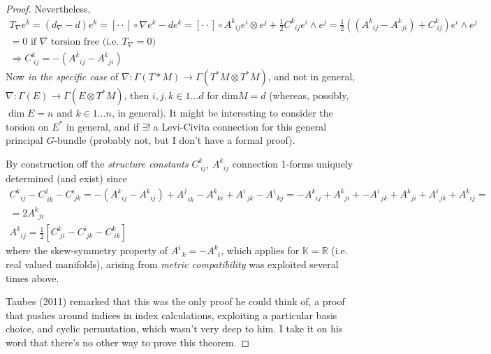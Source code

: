 \documentclass[10pt, twoside]{amsart}
\begin{document}
\begin{multicols*}{2}
\begin{proof}
Nevertheless, 
\[
\begin{gathered}
  T_{\nabla} e^k = (d_{\nabla} - d) e^k = [\cdot \cdot ] \circ \nabla e^k - de^k = [\cdot \cdot ] \circ A^k_{ \; \; ij} e^i \otimes e^j + \frac{1}{2} C^k_{ \; \; ij} e^i \wedge e^j = \frac{1}{2} ( (A^k_{ \; \; ij} - A^k_{ \; \; ji} ) + C^k_{ \; ij} ) e^i \wedge e^j \\ 
  =0 \text{ if $\nabla$ torsion free (i.e. $T_{\nabla} =0$) } \\
  \Longrightarrow C^k_{ \; ij} = -(A^k_{ \; \; ij} - A^k_{ \; \; ji})
\end{gathered}
\]
Now \emph{in the specific case} of $\nabla : \Gamma (T*M) \to \Gamma(T^*M \otimes T^*M)$, and not in general, $\nabla : \Gamma(E) \to \Gamma(E \otimes T^*M)$, then $i,j,k \in 1 \dots d$ for $\text{dim}M=d$ (whereas, possibly, $\dim{E}=n$ and $k \in 1 \dots n$, in general).  It might be interesting to consider the torsion on $E^*$ in general, and if $\exists ! $ a Levi-Civita connection for this general principal $G$-bundle (probably not, but I don't have a formal proof).  

By construction off the \emph{structure constants} $C^k_{\; ij}$, $A^k_{\; \; ij}$ connection 1-forms uniquely determined (and exist) since
\[
\begin{gathered}
  C^k_{ \; \; ij} - C^j_{ \; ik} - C^i_{ \; jk} = - (A^k_{ \; \; ij} - A^k_{ \; \; ij} ) + A^j_{ \; \; ik} - A^k_{ \; \; ki} + A^i_{ \; \; jk} - A^i_{ \; \; kj} = - A^k_{ \; \; ij} + A^k_{ \; \; ji} + - A^i_{ \; \; jk} + A^k_{ \; \; ji} + A^i_{ \; \; jk} + A^k_{ \; \; ij} = \\
  = 2 A^k_{ \; \; ji}  \\
  \boxed{ A^k_{ \; \; ij} = \frac{1}{2} [ C^k_{ \; ji} - C^i_{ \; jk} - C^k_{ \; ik } ] }
\end{gathered}
\]
where the skew-symmetry property of $A^i_{ \; \; k} = -A^k_{ \; \; i}$, which applies for $\mathbb{K} = \mathbb{R}$ (i.e. real valued manifolds), arising from \emph{metric compatibility} was exploited several times above.

Taubes (2011) \cite{CTaubes2011} remarked that this was the only proof he could think of, a proof that pushes around indices in index calculations, exploiting a particular basis choice, and cyclic permutation, which wasn't very deep to him.  I take it on his word that there's no other way to prove this theorem.  




\end{proof}


\end{multicols*}
\end{document}
